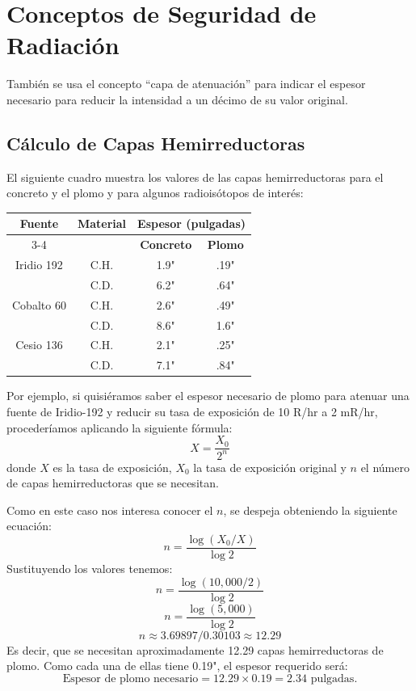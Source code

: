 \section*{Conceptos de Seguridad de Radiación}

También se usa el concepto ``capa de atenuación'' para indicar el espesor necesario para reducir la intensidad a un décimo de su valor original.

\subsection*{Cálculo de Capas Hemirreductoras}
El siguiente cuadro muestra los valores de las capas hemirreductoras para el concreto y el plomo y para algunos radioisótopos de interés:

\begin{table}[h]
\centering
\begin{tabular}{|c|c|c|c|}
\hline
\textbf{Fuente} & \textbf{Material} & \multicolumn{2}{c|}{\textbf{Espesor (pulgadas)}} \\
\cline{3-4}
 & & \textbf{Concreto} & \textbf{Plomo} \\
\hline
Iridio 192 & C.H. & 1.9" & .19" \\
 & C.D. & 6.2" & .64" \\
\hline
Cobalto 60 & C.H. & 2.6" & .49" \\
 & C.D. & 8.6" & 1.6" \\
\hline
Cesio 136 & C.H. & 2.1" & .25" \\
 & C.D. & 7.1" & .84" \\
\hline
\end{tabular}
\end{table}

Por ejemplo, si quisiéramos saber el espesor necesario de plomo para atenuar una fuente de Iridio-192 y reducir su tasa de exposición de 10 R/hr a 2 mR/hr, procederíamos aplicando la siguiente fórmula:
\[
X = \frac{X_0 }{ 2^n}
\]
donde \( X \) es la tasa de exposición, \( X_0 \) la tasa de exposición original y \( n \) el número de capas hemirreductoras que se necesitan.

Como en este caso nos interesa conocer el \( n \), se despeja obteniendo la siguiente ecuación:
\[
n = \frac{\log(X_0 / X)}{\log 2}
\]
Sustituyendo los valores tenemos:
\[
n = \frac{\log(10,000/2)}{\log 2}
\]
\[
n = \frac{\log(5,000)}{\log 2}
\]
\[
n \approx 3.69897 / 0.30103 \approx 12.29
\]
Es decir, que se necesitan aproximadamente 12.29 capas hemirreductoras de plomo. Como cada una de ellas tiene 0.19", el espesor requerido será:
\[
\text{Espesor de plomo necesario} = 12.29 \times 0.19 = 2.34 \text{ pulgadas}.
\]
